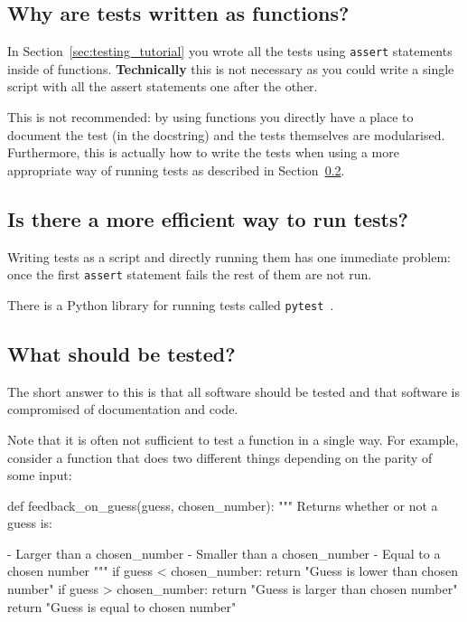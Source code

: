 \subsection{Why are tests written as functions?}

In Section~\ref{sec:testing_tutorial} you wrote all the tests using
\texttt{assert} statements inside of functions. \textbf{Technically} this is not
necessary as you could write a single script with all the assert statements one
after the other.

This is not recommended: by using functions you directly have a place to document
the test (in the docstring) and the tests themselves are modularised.
Furthermore, this is actually how to write the tests when using a more
appropriate way of running tests as described in
Section~\ref{sec:is_there_a_more_efficient_way_to_run_tests}.


\subsection{Is there a more efficient way to run tests?}
\label{sec:is_there_a_more_efficient_way_to_run_tests}

Writing tests as a script and directly running them has one immediate problem:
once the first \texttt{assert} statement fails the rest of them are not run.


There is a Python library for running tests called
\texttt{pytest}~\cite{oliveira2018pytest}.

\subsection{What should be tested?}
\label{\detokenize{building-tools/07-testing/why/main:what-should-be-tested}}

The short answer to this is that all software should be tested and that software
is compromised of documentation and code.


Note that it is often not sufficient to test a function in a single way. For
example, consider a function that does two different things depending on the
parity of some input:

\begin{python}
def feedback_on_guess(guess, chosen_number):
    """
    Returns whether or not a guess is:

    - Larger than  a chosen_number
    - Smaller than a chosen_number
    - Equal to a chosen number
    """
    if guess < chosen_number:
        return "Guess is lower than chosen number"
    if guess > chosen_number:
        return "Guess is larger than chosen number"
    return "Guess is equal to chosen number"
\end{python}

